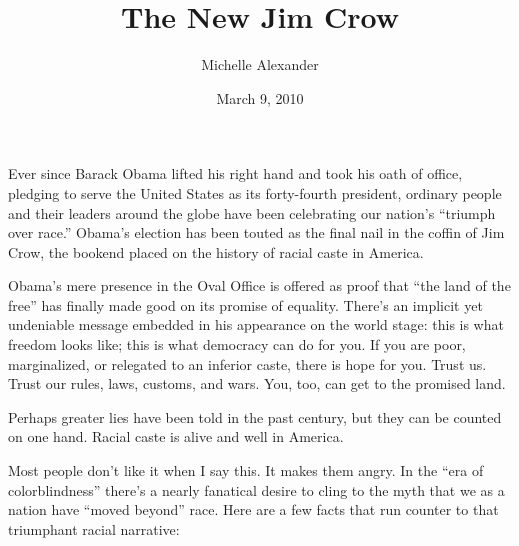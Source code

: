 \documentclass[10pt,a4paper]{article}
\begin{document}
\title{The New Jim Crow}
\date{March 9, 2010}
\author{Michelle Alexander}


\maketitle
    
\noindent\linenumbers Ever since Barack Obama lifted his right hand and took his oath of office, pledging to serve the United States as its forty-fourth president, ordinary people and their leaders around the globe have been celebrating our nation’s “triumph over race.” Obama’s election has been touted as the final nail in the coffin of Jim Crow, the bookend placed on the history of racial caste in America.

Obama’s mere presence in the Oval Office is offered as proof that “the land of the free” has finally made good on its promise of equality. There’s an implicit yet undeniable message embedded in his appearance on the world stage: this is what freedom looks like; this is what democracy can do for you. If you are poor, marginalized, or relegated to an inferior caste, there is hope for you. Trust us. Trust our rules, laws, customs, and wars. You, too, can get to the promised land.

Perhaps greater lies have been told in the past century, but they can be counted on one hand. Racial caste is alive and well in America.

Most people don’t like it when I say this. It makes them angry. In the “era of colorblindness” there’s a nearly fanatical desire to cling to the myth that we as a nation have “moved beyond” race. Here are a few facts that run counter to that triumphant racial narrative:
\end{document}
